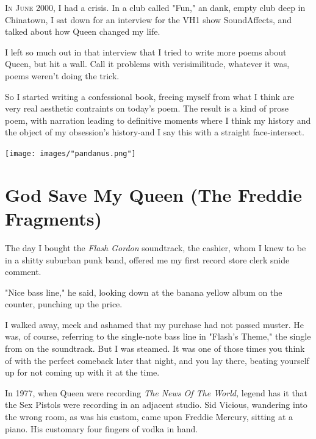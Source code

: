 \documentclass[
]{memoir}
\begin{document}
\lettrine[lines=3, findent=0em, nindent=0.1em, lhang=0]{I}{n June 2000},
I had a crisis. In a club called "Fun," an dank, empty club deep in
Chinatown, I sat down for an interview for the VH1 show SoundAffects,
and talked about how Queen changed my life.

I left so much out in that interview that I tried to write more poems
about Queen, but hit a wall. Call it problems with verisimilitude,
whatever it was, poems weren't doing the trick.

So I started writing a confessional book, freeing myself from what I
think are very real aesthetic contraints on today's poem. The result is
a kind of prose poem, with narration leading to definitive moments where
I think my history and the object of my obsession's history-and I say
this with a straight face-intersect.

\begin{center}\texttt{[image: images/"pandanus.png"]}\end{center}

\hypertarget{god-save-my-queen-the-freddie-fragments}{%
\section*{God Save My Queen (The Freddie
Fragments)}\label{god-save-my-queen-the-freddie-fragments}}

The day I bought the \emph{Flash Gordon} soundtrack, the cashier, whom I
knew to be in a shitty suburban punk band, offered me my first record
store clerk snide comment.

"Nice bass line," he said, looking down at the banana yellow album on
the counter, punching up the price.

I walked away, meek and ashamed that my purchase had not passed muster.
He was, of course, referring to the single-note bass line in "Flash's
Theme," the single from on the soundtrack. But I was steamed. It was one
of those times you think of with the perfect comeback later that night,
and you lay there, beating yourself up for not coming up with it at the
time.

In 1977, when Queen were recording \emph{The News Of The World,} legend
has it that the Sex Pistols were recording in an adjacent studio. Sid
Vicious, wandering into the wrong room, as was his custom, came upon
Freddie Mercury, sitting at a piano. His customary four fingers of vodka
in hand.
\end{document}
